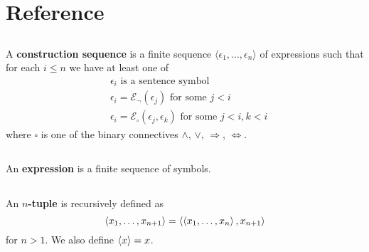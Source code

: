 \documentclass{report}
\begin{document}

\tableofcontents

\begingroup
\renewcommand\thechapter{R}

\chapter{Reference}%

\section{}%

  A \textbf{construction sequence} is a finite sequence
    $\langle \epsilon_1, \ldots, \epsilon_n \rangle$ of expressions such that
    for each $i \leq n$ we have at least one of
    \begin{align*}
      & \epsilon_i \text{ is a sentence symbol} \\
      & \epsilon_i = \mathcal{E}_\neg(\epsilon_j) \text{ for some } j < i \\
      & \epsilon_i = \mathcal{E}_\square(\epsilon_j, \epsilon_k)
        \text{ for some } j < i, k < i
    \end{align*}
    where $\square$ is one of the binary connectives $\land$, $\lor$,
      $\Rightarrow$, $\Leftrightarrow$.

\section{}%

  An \textbf{expression} is a finite sequence of symbols.

\section{}%

An \textbf{$n$-tuple} is recursively defined as
  $$\left< x_1, \ldots, x_{n+1} \right> = \left< \left< x_1, \ldots, x_n \right>, x_{n+1} \right>$$
  for $n > 1$.
We also define $\left< x \right> = x$.

\section{}%
\end{document}
